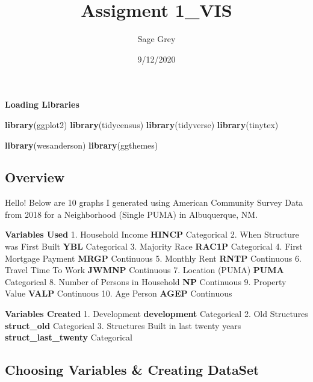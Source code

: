 \documentclass[
]{article}
\title{Assigment 1\_VIS}
\author{Sage Grey}
\date{9/12/2020}
\newenvironment{Shaded}{\begin{snugshade}}{\end{snugshade}}
\newcommand{\KeywordTok}[1]{\textcolor[rgb]{0.13,0.29,0.53}{\textbf{#1}}}
\newcommand{\NormalTok}[1]{#1}
\begin{document}
\maketitle

\textbf{Loading Libraries}

\begin{Shaded}
\begin{Highlighting}[]
\KeywordTok{library}\NormalTok{(ggplot2)}
\KeywordTok{library}\NormalTok{(tidycensus)}
\KeywordTok{library}\NormalTok{(tidyverse)}
\KeywordTok{library}\NormalTok{(tinytex)}


\KeywordTok{library}\NormalTok{(wesanderson)}
\KeywordTok{library}\NormalTok{(ggthemes)}
\end{Highlighting}
\end{Shaded}

\hypertarget{overview}{%
\subsection{Overview}\label{overview}}

Hello! Below are 10 graphs I generated using American Community Survey
Data from 2018 for a Neighborhood (Single PUMA) in Albuquerque, NM.

\textbf{Variables Used} 1. Household Income \textbar\textbar{}
\textbf{HINCP} \textbar\textbar{} Categorical 2. When Structure was
First Built \textbar\textbar{} \textbf{YBL} \textbar\textbar{}
Categorical 3. Majority Race \textbar\textbar{} \textbf{RAC1P}
\textbar\textbar{} Categorical 4. First Mortgage Payment
\textbar\textbar{} \textbf{MRGP} \textbar\textbar{} Continuous 5.
Monthly Rent\textbar\textbar{} \textbf{RNTP} \textbar\textbar{}
Continuous 6. Travel Time To Work \textbar\textbar{} \textbf{JWMNP}
\textbar\textbar{} Continuous 7. Location (PUMA) \textbar\textbar{}
\textbf{PUMA}\textbar\textbar{} Categorical 8. Number of Persons in
Household \textbar\textbar{} \textbf{NP}\textbar\textbar{} Continuous 9.
Property Value \textbar\textbar{} \textbf{VALP} \textbar\textbar{}
Continuous 10. Age Person \textbar\textbar{} \textbf{AGEP}
\textbar\textbar{} Continuous

\textbf{Variables Created} 1. Development \textbar\textbar{}
\textbf{development}\textbar\textbar{} Categorical 2. Old Structures
\textbar\textbar{} \textbf{struct\_old}\textbar\textbar{} Categorical 3.
Structures Built in last twenty years \textbar\textbar{}
\textbf{struct\_last\_twenty} \textbar\textbar{} Categorical

\hypertarget{choosing-variables-creating-dataset}{%
\subsection{Choosing Variables \& Creating
DataSet}\label{choosing-variables-creating-dataset}}
\end{document}
